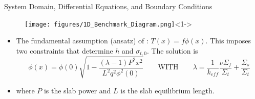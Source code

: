 \documentclass[9pt,t,aspectratio=169]{beamer}
\newcommand{\QWITH}{\qquad \text{WITH} \qquad}
\begin{document}
\begin{frame}{System Domain, Differential Equations, and Boundary Conditions}
    \vspace*{-0.45cm}
    \begin{figure}[T]
        \centering
        \texttt{[image: figures/1D\_Benchmark\_Diagram.png]}<1->
    \end{figure}
    \vspace{-0.325cm}
    \begin{itemize}
        \item The fundamental assumption (ansatz) of \cite{analytical-benchmark}: $T(x)=f\phi(x)$. This imposes two constraints that determine $h$ and $\sigma_{t,0}$. The solution is
        \begin{equation}
            \phi(x) = \phi(0) \sqrt{1 - \frac{(\lambda - 1)P^{2}x^{2}}{L^{2}q^{2}\phi^2(0)}} 
            \QWITH
            \lambda = \frac{1}{k_{eff}}\frac{\nu \Sigma_{f}}{\Sigma_{t}} + \frac{\Sigma_{s}}{\Sigma_{t}}
        \end{equation}
        \item where $P$ is the slab power and $L$ is the slab equilibrium length.
    \end{itemize}
\end{frame}

\end{document}
